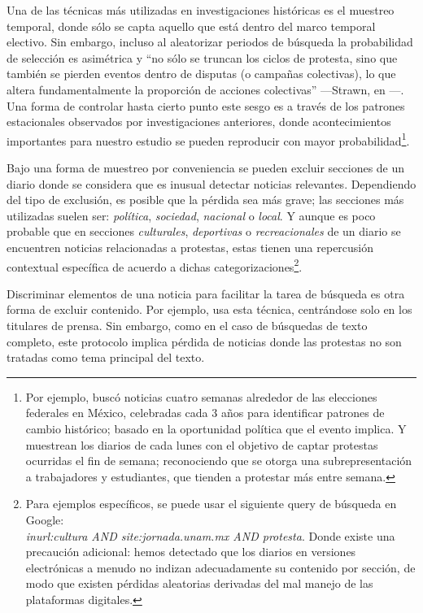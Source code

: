 \documentclass[letterpaper, 11pt]{book}
\theoremstyle{definition}
\theoremstyle{remark}
\begin{document}
Una de las técnicas más utilizadas en investigaciones históricas es el muestreo temporal, donde sólo se capta aquello que está dentro del marco temporal electivo. 
Sin embargo, incluso al aleatorizar periodos de búsqueda la probabilidad de selección es asimétrica y ``no sólo se truncan los ciclos de protesta, sino que también se pierden eventos dentro de disputas (o campañas colectivas), lo que altera fundamentalmente la proporción de acciones colectivas'' ---Strawn, en \citep[130]{2003_Wada_Tesis}---. 
Una forma de controlar hasta cierto punto este sesgo es a través de los patrones estacionales observados por investigaciones anteriores, donde acontecimientos importantes para nuestro estudio se pueden reproducir con mayor probabilidad\footnote{
Por ejemplo, \citet{2003_Wada_Tesis} buscó noticias cuatro semanas alrededor de las elecciones federales en México, celebradas cada 3 años para identificar patrones de cambio histórico; basado en la oportunidad política que el evento implica. Y \citet{2002_Koopmans_AEP} muestrean los diarios de  cada lunes con el objetivo de captar protestas ocurridas el fin de semana; reconociendo que se otorga una subrepresentación a trabajadores y estudiantes, que tienden a protestar más entre semana.}.

Bajo una forma de muestreo por conveniencia se pueden excluir secciones de un diario donde se considera que es inusual detectar noticias relevantes. Dependiendo del tipo de exclusión, es posible que la pérdida sea más grave; las secciones más utilizadas suelen ser: \emph{política}, \emph{sociedad}, \emph{nacional} o \emph{local}. 
Y aunque es poco probable que en secciones \emph{culturales}, \emph{deportivas} o \emph{recreacionales} de un diario se encuentren noticias relacionadas a protestas, estas tienen una repercusión contextual específica de acuerdo a dichas categorizaciones\footnote{Para ejemplos específicos, se puede usar el siguiente query de búsqueda en Google:\\ \emph{inurl:cultura AND  site:jornada.unam.mx AND protesta}. Donde existe una precaución adicional: hemos detectado que los diarios en versiones electrónicas a menudo no indizan adecuadamente su contenido por sección, de modo que existen pérdidas aleatorias derivadas del mal manejo de las plataformas digitales.}.

Discriminar elementos de una noticia para facilitar la tarea de búsqueda es otra forma de excluir contenido. 
Por ejemplo, \citet{2015_Danilova_Linguistic} usa esta técnica, centrándose solo en los titulares de prensa. 
Sin embargo, como en el caso de búsquedas de texto completo, este protocolo implica pérdida de noticias donde las protestas no son tratadas como tema principal del texto.
\end{document}
